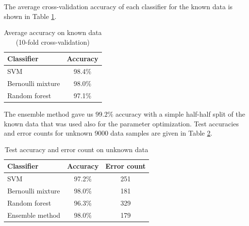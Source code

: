 The average cross-validation accuracy of each classifier for the known
data is shown in Table \ref{results1k}.

\begin{table}[!ht]
\caption{Average accuracy on known data (10-fold cross-validation)}
\label{results1k}
\begin{center}
\begin{tabular}{l|c}
Classifier & Accuracy \\ \hline
SVM & 98.4\% \\
Bernoulli mixture & 98.0\% \\
Random forest & 97.1\% \\
\end{tabular}
\end{center}
\end{table}

The ensemble method gave us $99.2 \%$ accuracy with a simple half-half
split of the known data that was used also for the parameter
optimization. Test accuracies and error counts for unknown 9000 data
samples are given in Table \ref{results9k}.

\begin{table}[!ht]
\caption{Test accuracy and error count on unknown data}
\label{results9k}
\begin{center}
\begin{tabular}{l|c|c}
Classifier & Accuracy & Error count \\ \hline
SVM & 97.2\% & 251 \\
Bernoulli mixture & 98.0\% & 181 \\
Random forest & 96.3\% & 329 \\ \hline
Ensemble method & 98.0\% & 179 \\
\end{tabular}
\end{center}
\end{table}
